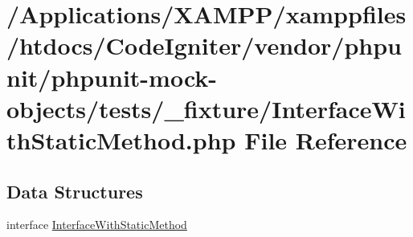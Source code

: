 \hypertarget{_interface_with_static_method_8php}{}\section{/\+Applications/\+X\+A\+M\+P\+P/xamppfiles/htdocs/\+Code\+Igniter/vendor/phpunit/phpunit-\/mock-\/objects/tests/\+\_\+fixture/\+Interface\+With\+Static\+Method.php File Reference}
\label{_interface_with_static_method_8php}
\subsection*{Data Structures}
\begin{DoxyCompactItemize}
\item 
interface \mbox{\hyperlink{interface_interface_with_static_method}{Interface\+With\+Static\+Method}}
\end{DoxyCompactItemize}
